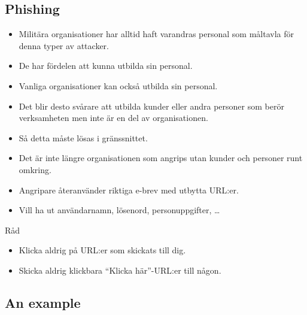 \subsection{Phishing}

\begin{frame}
  \begin{itemize}
    \item Militära organisationer har alltid haft varandras personal som 
      måltavla för denna typer av attacker.

    \item De har fördelen att kunna utbilda sin personal.

    \item Vanliga organisationer kan också utbilda sin personal.

    \item Det blir desto svårare att utbilda kunder eller andra personer som 
      berör verksamheten men inte är en del av organisationen.

    \item Så detta måste lösas i gränssnittet.

  \end{itemize}
\end{frame}

\begin{frame}
  \begin{itemize}
    \item Det är inte längre organisationen som angrips utan kunder och 
      personer runt omkring.

    \item Angripare återanvänder riktiga e-brev med utbytta URL:er.

    \item Vill ha ut användarnamn, lösenord, personuppgifter, \dots
  \end{itemize}

  \begin{block}{Råd}
    \begin{itemize}
      \item Klicka aldrig på URL:er som skickats till dig.
      \item Skicka aldrig klickbara \enquote{Klicka här}-URL:er till någon.
    \end{itemize}
  \end{block}

\end{frame}

\subsection{An example}

